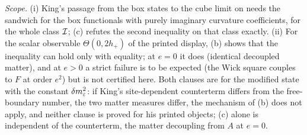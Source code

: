 \emph{Scope.} (i) King's passage from the box states to the cube limit on \cite[p.~336]{K2} needs the sandwich for the box functionals with purely imaginary curvature coefficients, \ie for the whole class $\mathcal I$; (c) refutes the second inequality on that class exactly. (ii) For the scalar observable $\Theta(0,2h_+)$ of the printed display, (b) shows that the inequality can hold only with equality; at $e=0$ it does (identical decoupled matter), and at $e>0$ a strict failure is to be expected (the Wick square couples to $F$ at order $e^2$) but is not certified here. Both clauses are for the modified state with the constant $\delta m^2_{\varepsilon}$: if King's site-dependent counterterm differs from the free-boundary number, the two matter measures differ, the mechanism of (b) does not apply, and neither clause is proved for his printed objects; (c) alone is independent of the counterterm, the matter decoupling from $A$ at $e=0$.

